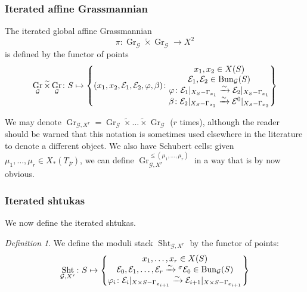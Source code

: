 \documentclass[reqno]{amsart}
\numberwithin{equation}{section}
\newcommand{\wt}[1]{\widetilde{#1}}
\newcommand{\ol}[1]{\overline{#1}}
\newcommand{\Cal}[1]{\mathcal{#1}}
\newcommand{\co}{\colon}
\DeclareMathOperator{\Bun}{Bun}
\DeclareMathOperator{\Gr}{Gr}
\DeclareMathOperator{\Sht}{Sht}
\theoremstyle{remark}
\newtheorem{defn}[thm]{Definition}
\numberwithin{equation}{section}
\begin{document}
\subsubsection{Iterated affine Grassmannian}\label{sssec: iterated aff gr}
The iterated global affine Grassmannian  
\[
\pi \co \Gr_{\Cal{G}} \wt{\times} \Gr_{\Cal{G}} \rightarrow X^2
\]
is defined by the functor of points
\[
\Gr_{\Cal{G}} \wt{\times} \Gr_{\Cal{G}}\co S \mapsto  \left\{ (x_1, x_2, \Cal{E}_1, \Cal{E}_2, \varphi,  \beta)  \colon  \begin{array}{@{}c@{}} 
x_1,x_2 \in X(S) \\
  \Cal{E}_1, \Cal{E}_2 \in \Bun_{\Cal{G}}(S)  \\
  \varphi \co \Cal{E}_1 |_{X_S - \Gamma_{x_1}}  \xrightarrow{\sim} \Cal{E}_2|_{X_S-\Gamma_{x_1}} \\ 
  \beta \co \Cal{E}_2|_{X_S - \Gamma_{x_2}} \xrightarrow{\sim} \Cal{E}^0 |_{X_S-\Gamma_{x_2}} \\ 
 \end{array} \right\}   
\]

We may denote $\Gr_{\Cal{G},X^r} = \Gr_{\Cal{G}} \wt{\times} \ldots \wt{\times}\Gr_{\Cal{G}}$ ($r$ times), although the  reader should be warned that this notation is sometimes used elsewhere in the literature to denote a different object. We also have Schubert cells: given $\mu_1, \ldots, \mu_r \in X_*(T_{\ol{F}})$, we can define $\Gr_{\Cal{G},X^r}^{\leq (\mu_1,\ldots,\mu_r)}$ in a way that is by now obvious.


\subsubsection{Iterated shtukas}  We now define the iterated shtukas. 

\begin{defn}\label{def: iterated shtukas}
We define the moduli stack $\Sht_{\Cal{G},X^r}$ by the functor of points:
\[
\Sht_{\Cal{G},X^r} \co S \mapsto \left\{   \begin{array}{@{}c@{}} 
x_1,\ldots,x_r \in X(S)  \\
\Cal{E}_0, \Cal{E}_1, \ldots, \Cal{E}_r \xrightarrow{\sim} {}^{\sigma} \Cal{E}_0  \in \Bun_{\Cal{G}}(S)  \\
\varphi_i \colon \Cal{E}_i|_{X \times S - \Gamma_{x_{i+1}}} \xrightarrow{\sim} \Cal{E}_{i+1}|_{X \times S - \Gamma_{x_{i+1}}}
 \end{array} \right\}
\]
	\end{defn}
	
\end{document}
